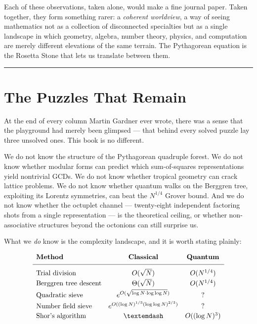 \documentclass[12pt, letterpaper, openany]{book}
\theoremstyle{definition}
\theoremstyle{remark}
\begin{document}
Each of these observations, taken alone, would make a fine journal paper. Taken together, they form something rarer: a \textit{coherent worldview}, a way of seeing mathematics not as a collection of disconnected specialties but as a single landscape in which geometry, algebra, number theory, physics, and computation are merely different elevations of the same terrain. The Pythagorean equation is the Rosetta Stone that lets us translate between them.


\bigskip\noindent\rule{\textwidth}{0.4pt}\bigskip



\section*{The Puzzles That Remain}


At the end of every column Martin Gardner ever wrote, there was a sense that the playground had merely been glimpsed --- that behind every solved puzzle lay three unsolved ones. This book is no different.

We do not know the structure of the Pythagorean quadruple forest. We do not know whether modular forms can predict which sum-of-squares representations yield nontrivial GCDs. We do not know whether tropical geometry can crack lattice problems. We do not know whether quantum walks on the Berggren tree, exploiting its Lorentz symmetries, can beat the $N^{1/4}$ Grover bound. And we do not know whether the octuplet channel --- twenty-eight independent factoring shots from a single representation --- is the theoretical ceiling, or whether non-associative structures beyond the octonions can still surprise us.

What we \textit{do} know is the complexity landscape, and it is worth stating plainly:

\[
\begin{array}{lcc}
\textbf{Method} & \textbf{Classical} & \textbf{Quantum} \\[4pt]
\hline
\\[-6pt]
\text{Trial division} & O(\sqrt{N}) & O(N^{1/4}) \\[2pt]
\text{Berggren tree descent} & \Theta(\sqrt{N}) & O(N^{1/4}) \\[2pt]
\text{Quadratic sieve} & e^{O(\sqrt{\log N \cdot \log\log N})} & ? \\[2pt]
\text{Number field sieve} & e^{O((\log N)^{1/3}(\log\log N)^{2/3})} & ? \\[2pt]
\text{Shor's algorithm} & — & O((\log N)^3) \\[2pt]
\end{array}
\]
\end{document}
